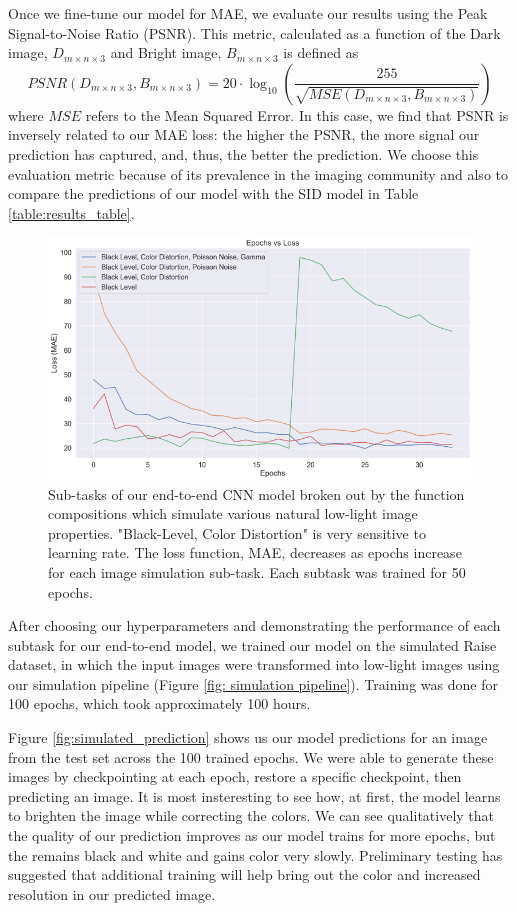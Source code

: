 \documentclass{article}
\begin{document}
Once we fine-tune our model for MAE, we evaluate our results using the Peak Signal-to-Noise Ratio (PSNR). This metric, calculated as a function of the Dark image, $D_{m\times n\times 3}$ and Bright image, $B_{m\times n\times 3}$ is defined as
\[
PSNR(D_{m\times n\times 3}, B_{m\times n\times 3}) = 20\cdot \log_{10}(\frac{255}{\sqrt{MSE(D_{m\times n\times 3}, B_{m\times n\times 3})}})
\]
where \(MSE\) refers to the Mean Squared Error. In this case, we find that PSNR is inversely related to our MAE loss: the higher the PSNR, the more signal our prediction has captured, and, thus, the better the prediction. We choose this evaluation metric because of its prevalence in the imaging community and also to compare the predictions of our model with the SID model in Table \ref{table:results_table}.

\begin{figure}[ht]
  \centering
  \includegraphics[scale=0.36]{losses_all_4}
  \caption{Sub-tasks of our end-to-end CNN model broken out by the function compositions which simulate various natural low-light image properties. "Black-Level, Color Distortion" is very sensitive to learning rate. The loss function, MAE, decreases as epochs increase for each image simulation sub-task. Each subtask was trained for 50 epochs.}
  \label{fig:losses_all_4}
\end{figure}

After choosing our hyperparameters and demonstrating the performance of each subtask for our end-to-end model, we trained our model on the simulated Raise dataset, in which the input images were transformed into low-light images using our simulation pipeline (Figure \ref{fig: simulation pipeline}). Training was done for 100 epochs, which took approximately 100 hours. 

Figure \ref{fig:simulated_prediction} shows us our model predictions for an image from the test set across the 100 trained epochs. We were able to generate these images by checkpointing at each epoch, restore a specific checkpoint, then predicting an image. It is most insteresting to see how, at first, the model learns to brighten the image while correcting the colors. We can see qualitatively that the quality of our prediction improves as our model trains for more epochs, but the remains black and white and gains color very slowly. Preliminary testing has suggested that additional training will help bring out the color and increased resolution in our predicted image.
\end{document}

